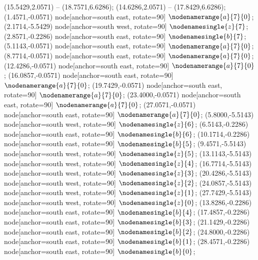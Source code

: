    (15.5429,2.0571) -- (18.7571,6.6286);
   (14.6286,2.0571) -- (17.8429,6.6286);
   (1.4571,-0.0571) node[anchor=south east, rotate=90] {$\nodenamerange{a}{7}{0}$};
   (2.1714,-5.5429) node[anchor=south west, rotate=90] {$\nodenamesingle{z}{7}$};
   (2.8571,-0.2286) node[anchor=south east, rotate=90] {$\nodenamesingle{b}{7}$};
   (5.1143,-0.0571) node[anchor=south east, rotate=90] {$\nodenamerange{a}{7}{0}$};
   (8.7714,-0.0571) node[anchor=south east, rotate=90] {$\nodenamerange{a}{7}{0}$};
   (12.4286,-0.0571) node[anchor=south east, rotate=90] {$\nodenamerange{a}{7}{0}$};
   (16.0857,-0.0571) node[anchor=south east, rotate=90] {$\nodenamerange{a}{7}{0}$};
   (19.7429,-0.0571) node[anchor=south east, rotate=90] {$\nodenamerange{a}{7}{0}$};
   (23.4000,-0.0571) node[anchor=south east, rotate=90] {$\nodenamerange{a}{7}{0}$};
   (27.0571,-0.0571) node[anchor=south east, rotate=90] {$\nodenamerange{a}{7}{0}$};
   (5.8000,-5.5143) node[anchor=south west, rotate=90] {$\nodenamesingle{z}{6}$};
   (6.5143,-0.2286) node[anchor=south east, rotate=90] {$\nodenamesingle{b}{6}$};
   (10.1714,-0.2286) node[anchor=south east, rotate=90] {$\nodenamesingle{b}{5}$};
   (9.4571,-5.5143) node[anchor=south west, rotate=90] {$\nodenamesingle{z}{5}$};
   (13.1143,-5.5143) node[anchor=south west, rotate=90] {$\nodenamesingle{z}{4}$};
   (16.7714,-5.5143) node[anchor=south west, rotate=90] {$\nodenamesingle{z}{3}$};
   (20.4286,-5.5143) node[anchor=south west, rotate=90] {$\nodenamesingle{z}{2}$};
   (24.0857,-5.5143) node[anchor=south west, rotate=90] {$\nodenamesingle{z}{1}$};
   (27.7429,-5.5143) node[anchor=south west, rotate=90] {$\nodenamesingle{z}{0}$};
   (13.8286,-0.2286) node[anchor=south east, rotate=90] {$\nodenamesingle{b}{4}$};
   (17.4857,-0.2286) node[anchor=south east, rotate=90] {$\nodenamesingle{b}{3}$};
   (21.1429,-0.2286) node[anchor=south east, rotate=90] {$\nodenamesingle{b}{2}$};
   (24.8000,-0.2286) node[anchor=south east, rotate=90] {$\nodenamesingle{b}{1}$};
   (28.4571,-0.2286) node[anchor=south east, rotate=90] {$\nodenamesingle{b}{0}$};
